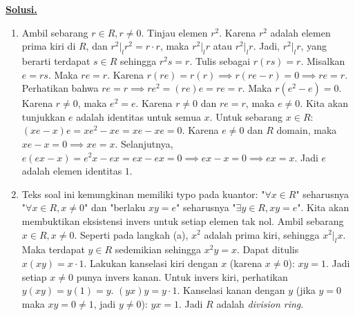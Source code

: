 \documentclass[12pt,twoside]{article}
\newenvironment{solution}
{
	\par\noindent\textbf{\underline{Solusi.}}\\
}
{
	\par
}
\begin{document}
\begin{enumerate}
\begin{solution}
          \begin{enumerate}
            \item[(a)] Ambil sebarang $r \in R, r \neq 0$.
                  Tinjau elemen $r^2$. Karena $r^2$ adalah elemen prima kiri di $R$, dan $r^2 |_l r^2 = r \cdot r$, maka $r^2 |_l r$ atau $r^2 |_l r$.
                  Jadi, $r^2 |_l r$, yang berarti terdapat $s \in R$ sehingga $r^2 s = r$.
                  Tulis sebagai $r(rs) = r$.
                  Misalkan $e = rs$. Maka $re = r$.
                  Karena $r(re) = r(r) \implies r(re-r)=0 \implies re=r$.
                  Perhatikan bahwa $r e = r \implies r e^2 = (re)e = re = r$.
                  Maka $r(e^2 - e) = 0$. Karena $r \ne 0$, maka $e^2 = e$.
                  Karena $r \ne 0$ dan $re=r$, maka $e \ne 0$.
                  Kita akan tunjukkan $e$ adalah identitas untuk semua $x$.
                  Untuk sebarang $x \in R$:
                  $(xe - x)e = x e^2 - xe = xe - xe = 0$.
                  Karena $e \ne 0$ dan $R$ domain, maka $xe - x = 0 \implies xe = x$.
                  Selanjutnya, $e(ex - x) = e^2 x - ex = ex - ex = 0 \implies ex - x = 0 \implies ex = x$.
                  Jadi $e$ adalah elemen identitas $1$.

            \item[(b)] Teks soal ini kemungkinan memiliki typo pada kuantor: "$\forall x \in R$" seharusnya "$\forall x \in R, x \neq 0$" dan "berlaku $xy=e$" seharusnya "$\exists y \in R, xy=e$".
                  Kita akan membuktikan eksistensi invers untuk setiap elemen tak nol.
                  Ambil sebarang $x \in R, x \neq 0$.
                  Seperti pada langkah (a), $x^2$ adalah prima kiri, sehingga $x^2 |_l x$.
                  Maka terdapat $y \in R$ sedemikian sehingga $x^2 y = x$.
                  Dapat ditulis $x(xy) = x \cdot 1$.
                  Lakukan kanselasi kiri dengan $x$ (karena $x \neq 0$):
                  $xy = 1$.
                  Jadi setiap $x \neq 0$ punya invers kanan.
                  Untuk invers kiri, perhatikan $y(xy) = y(1) = y$.
                  $(yx)y = y \cdot 1$.
                  Kanselasi kanan dengan $y$ (jika $y=0$ maka $xy=0 \ne 1$, jadi $y \ne 0$):
                  $yx = 1$.
                  Jadi $R$ adalah \textit{division ring}.
          \end{enumerate}
        \end{solution}
\end{enumerate}
\newpage
\end{document}
